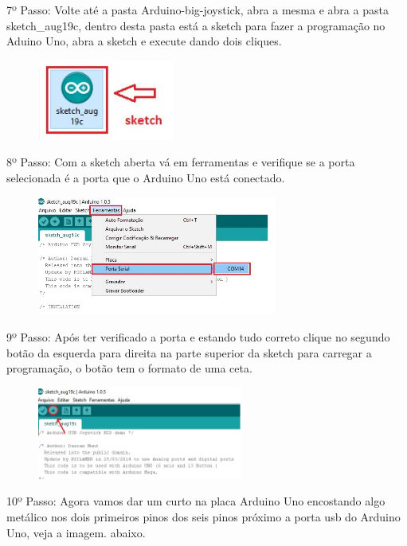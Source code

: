 \documentclass[
	12pt,			%
	openright,		%
	oneside,			%
	a4paper,			%
	chapter=TITLE,		%
	english,			%
	brazil,			%
	]{abntex2}
\begin{document}
\begin{anexosenv}
7º Passo: Volte até a pasta Arduino-big-joystick, abra a mesma e abra a pasta sketch\_aug19c, dentro desta pasta está a sketch  para fazer a programação no Aduino Uno, abra a sketch e execute dando dois cliques.

\begin{figure}[H]
	\centering
		\includegraphics[width=0.4\textwidth]{./img/anex-img-7.jpg}
\end{figure}

8º Passo: Com a sketch aberta vá em ferramentas e verifique se a porta selecionada é a porta que o Arduino Uno está conectado.

\begin{figure}[H]
	\centering
		\includegraphics[width=0.7\textwidth]{./img/anex-img-8.jpg}
\end{figure}

9º Passo: Após ter verificado a porta e estando tudo correto clique no segundo botão da esquerda para direita na parte superior da sketch para carregar a programação, o botão tem o formato de uma ceta.

\begin{figure}[H]
	\centering
		\includegraphics[width=0.6\textwidth]{./img/anex-img-9.jpg}
\end{figure}

10º Passo: Agora vamos dar um curto na placa Arduino Uno encostando algo metálico nos dois primeiros pinos dos seis pinos próximo a porta usb do Arduino Uno, veja a imagem. abaixo.


\end{anexosenv}
\end{document}
